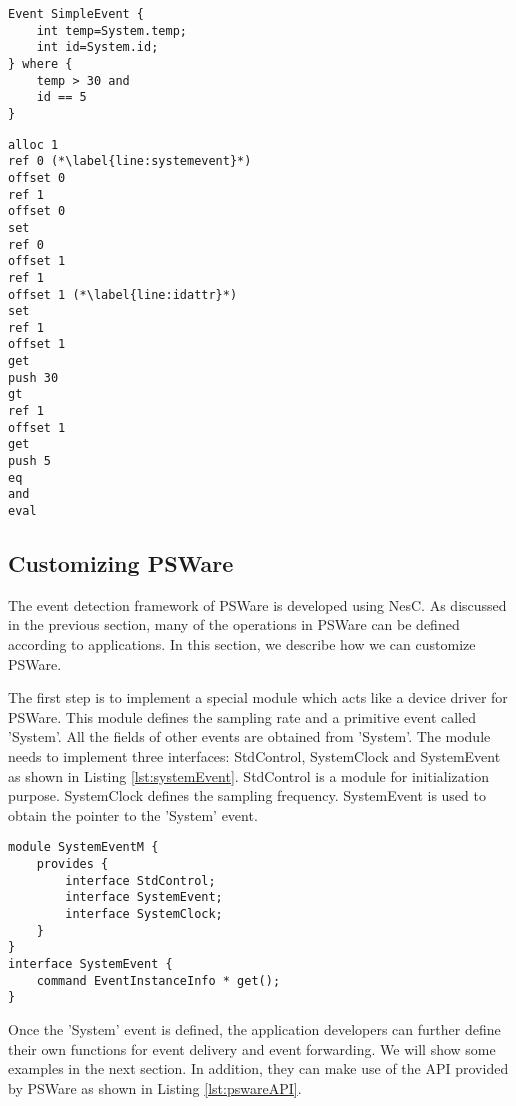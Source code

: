 \begin{lstlisting}[caption=Original EDL program, label=lst:originaledl]
Event SimpleEvent {
	int temp=System.temp;
	int id=System.id;
} where {
	temp > 30 and
	id == 5
}
\end{lstlisting}
\begin{lstlisting}[caption=Translated EDL program, label=lst:translatededl]
alloc 1
ref 0 (*\label{line:systemevent}*)
offset 0
ref 1
offset 0
set
ref 0
offset 1
ref 1
offset 1 (*\label{line:idattr}*)
set
ref 1
offset 1
get
push 30
gt
ref 1
offset 1
get
push 5
eq
and
eval
\end{lstlisting}

\subsection{Customizing PSWare}
The event detection framework of PSWare is developed using NesC. As discussed in the previous section, many of the operations in PSWare can be defined according to applications. In this section, we describe how we can customize PSWare.

The first step is to implement a special module which acts like a device driver for PSWare. This module defines the sampling rate and a primitive event called 'System'. All the fields of other events are obtained from 'System'. The module needs to implement three interfaces: StdControl, SystemClock and SystemEvent as shown in Listing \ref{lst:systemEvent}. StdControl is a module for initialization purpose. SystemClock defines the sampling frequency. SystemEvent is used to obtain the pointer to the 'System' event.

\begin{lstlisting}[caption=API of the 'System' event, label=lst:systemEvent]
module SystemEventM {
	provides {
		interface StdControl;
		interface SystemEvent;
		interface SystemClock;
	}
}
interface SystemEvent {
	command EventInstanceInfo * get();
}
\end{lstlisting}

Once the 'System' event is defined, the application developers can further define their own functions for event delivery and event forwarding. We will show some examples in the next section. In addition, they can make use of the API provided by PSWare as shown in Listing \ref{lst:pswareAPI}.

